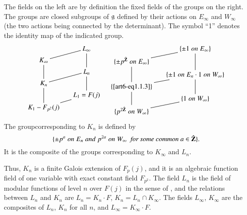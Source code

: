 \begin{definitions*}
The fields on the left are by definition the fixed fields of the groups on the right. The groups are closed subgroups of $\mathfrak{g}$ defined by their actions on $E_\infty$ and $W_\infty$ (the two actions being connected by the determinant). The symbol ``1'' denotes the identity map of the indicated group.
$$
\xymatrix@R=0.1cm@C=0.5cm{
& L_\infty \ar@{-}[dd]\\
K_\infty \ar@{-}[ur] \ar@{-}[dd]& \\
& L_n \ar@{-}[dd] \\
K_n \ar@{-}[ur] \ar@{-}[dd]&\\
& L_1 = F(j)\\
K_1 - F_{p^2} (j) \ar@{-}[ur]& 
}
\quad
\xymatrix@R=0.1cm@C=0.5cm{
& \{ \pm 1 \; on\; E_\infty \} \ar@{-}[dd]\\
\{\pm p^{\hat{\bZ}} \;on\; E_\infty\}\ar@{-}[ur] \ar@{-}[dd]& \\
& \{\pm 1 \;on\; E_n \cdot 1 \; on \; W_\infty\} \ar@{-}[dd] \\
\{\eqref{art6-eq1.1.3}\}  \ar@{-}[ur] \ar@{-}[dd]&\\
& \{1 \; on \; W_\infty \}\\
\{p^{2 \hat{\bZ}} \; on \; W_\infty\}  \ar@{-}[ur]& 
}
$$
The group\pageoriginale corresponding to $K_n$ is defined by 
\begin{equation}
\{\pm p^a \; on \; E_n \; and \; p^{2a} \;on\; W_\infty \textit{\; for some common } a \in \hat{\mathbf{Z}}\}. \label{art6-eq1.1.3}
\end{equation}
It is the composite of the groups corresponding to $K_\infty$ and $L_n$. 
 
Thus, $K_n$ is a finite Galois extension of $F_p(j)$, and it is an algebraic function field of one variable with exact constant field $F_{p^2}$. The field $L_n$ is the field of modular functions of level $n$ over $F(j)$ in the sense of \cite{art6-key5}, and the relations between $L_n$ and $K_n$ are $L_n = K_n \cdot F$, $K_n = L_n \cap K_\infty$. The fields $L_\infty$, $K_\infty$ are the composites of $L_n $, $K_n$ for all $n$, and $L_\infty = K_\infty \cdot F$.


\end{definitions*}
